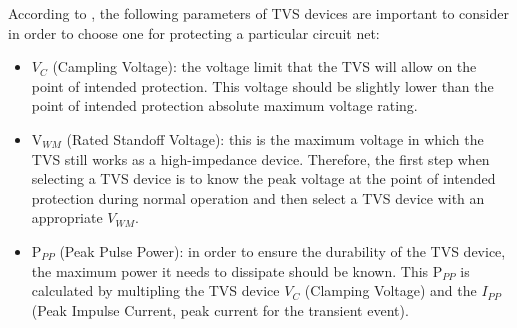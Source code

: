 		\label{ssssec:tvsSelection}
		According to \cite{microSemiSelectTVS}, the following parameters of TVS devices are important to consider in order to choose one for protecting a particular circuit net:

		\begin{itemize}
			\item $V_{C}$ (Campling Voltage): the voltage limit that the TVS will allow on the point of intended protection. This voltage should be slightly lower than the point of intended protection absolute maximum voltage rating.\label{itm:campling-voltage}
			\item V$_{WM}$ (Rated Standoff Voltage): this is the maximum voltage in which the TVS still works as a high-impedance device. Therefore, the first step when selecting a TVS device is to know the peak voltage at the point of intended protection during normal operation and then select a TVS device with an appropriate $V_{WM}$.\label{itm:tvs-standoff-voltage}
			\item P$_{PP}$ (Peak Pulse Power): in order to ensure the durability of the TVS device, the maximum power it needs to dissipate should be known. This P$_{PP}$ is calculated by multipling the TVS device $V_{C}$ (Clamping Voltage) and the $I_{PP}$ (Peak Impulse Current, peak current for the transient event).\label{itm:peak-pulse-power}
		\end{itemize}